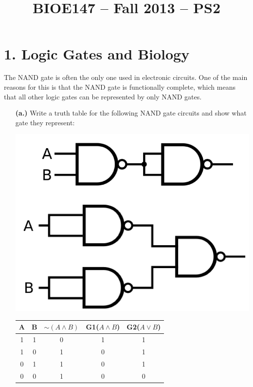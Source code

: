 \documentclass[11pt]{article}
\title{BIOE147 -- Fall 2013 -- PS2}
\author{\Name}
\begin{document}
\maketitle
\section*{1. Logic Gates and Biology}

The NAND gate is often the only one used in electronic circuits. One of the main reasons for this is that the NAND gate is functionally complete, which means that all other logic gates can be represented by only NAND gates.

\begin{itemize}

 \item[{\bf (a.)}]Write a truth table for the following NAND gate circuits and show what gate they represent:

{\centering
  \includegraphics[scale=0.3, trim = 0mm 0mm 7mm 0mm, clip]{ps2_logic.png}\par
 }
{
  \centering
  \begin{tabular}{ c | c | c | c | c }
    A & B & $\sim(A\wedge B)$ & G1($A\wedge B$) & G2($A\vee B$) \\
  \hline
  1 & 1 & 0 & 1 & 1 \\
  1 & 0 & 1 & 0 & 1 \\
  0 & 1 & 1 & 0 & 1 \\
  0 & 0 & 1 & 0 & 0 \\
  \end{tabular}
  \par
}


\end{itemize}
\end{document}
